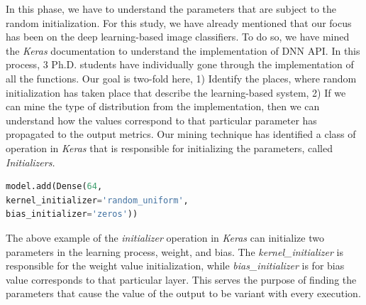 In this phase, we have to understand the parameters that are subject to the random initialization. For this study, we have already mentioned that our focus has been on the deep learning-based image classifiers. To do so, we have mined the \emph{Keras} \cite{chollet2015keras} documentation to understand the implementation of DNN API. In this process, 3 Ph.D. students have individually gone through the implementation of all the functions. Our goal is two-fold here, 1) Identify the places, where random initialization has taken place that describe the learning-based system, 2) If we can mine the type of distribution from the implementation, then we can understand how the values correspond to that particular parameter has propagated to the output metrics. Our mining technique has identified a class of operation in \emph{Keras} that is responsible for initializing the parameters, called \emph{Initializers.} 
\begin{lstlisting}[language=Python, caption=Example of initialization parameters in Keras]
model.add(Dense(64,
kernel_initializer='random_uniform',
bias_initializer='zeros'))
\end{lstlisting}
The above example of the \emph{initializer} operation in \emph{Keras} can initialize two parameters in the learning process, weight, and bias. The \emph{kernel\_initializer} is responsible for the weight value initialization, while \emph{bias\_initializer} is for bias value corresponds to that particular layer. This serves the purpose of finding the parameters that cause the value of the output to be variant with every execution. 


